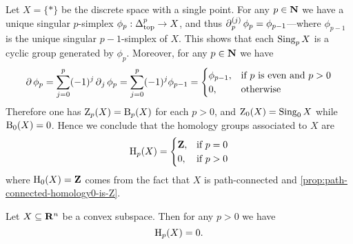 \begin{example}
\label{exp:homology-of-point-space}
Let \(X = \{*\}\) be the discrete space with a single point. For any \(p \in
\mathbf{N}\) we have a unique singular \(p\)-simplex \(\phi_p: \Delta_{\text{top}}^p \to X\), and
thus \(\operatorname{\partial}_p^{(j)} \phi_p = \phi_{p-1}\)---where \(\phi_{p-1}\) is the unique
singular \(p-1\)-simplex of \(X\). This shows that each \(\operatorname{Sing}_p X\) is a
cyclic group generated by \(\phi_p\). Moreover, for any \(p \in \mathbf{N}\) we have
\[
\operatorname{\partial} \phi_p = \sum_{j=0}^p (-1)^j \operatorname{\partial}_j \phi_p
= \sum_{j=0}^p (-1)^j \phi_{p-1}
=
\begin{cases}
  \phi_{p-1}, &\text{if } p \text{ is even and } p > 0 \\
  0, &\text{otherwise}
\end{cases}
\]
Therefore one has \(\operatorname{Z}_p(X) = \operatorname{B}_p(X)\) for each \(p > 0\), and
\(\operatorname{Z}_0(X) = \operatorname{Sing}_0 X\) while \(\operatorname{B}_0(X) = 0\). Hence we conclude that the
homology groups associated to \(X\) are
\[
\operatorname{H}_p(X) =
\begin{cases}
  \mathbf{Z}, &\text{if } p = 0 \\
  0, &\text{if } p > 0
\end{cases}
\]
where \(\operatorname{H}_0(X) = \mathbf{Z}\) comes from the fact that \(X\) is path-connected and
\cref{prop:path-connected-homology0-is-Z}.
\end{example}

\begin{theorem}
\label{thm:convex-space-Rn-zero-homology}
Let \(X \subseteq \mathbf{R}^n\) be a convex subspace. Then for any \(p > 0\) we have
\[
\operatorname{H}_p(X) = 0.
\]
\end{theorem}

